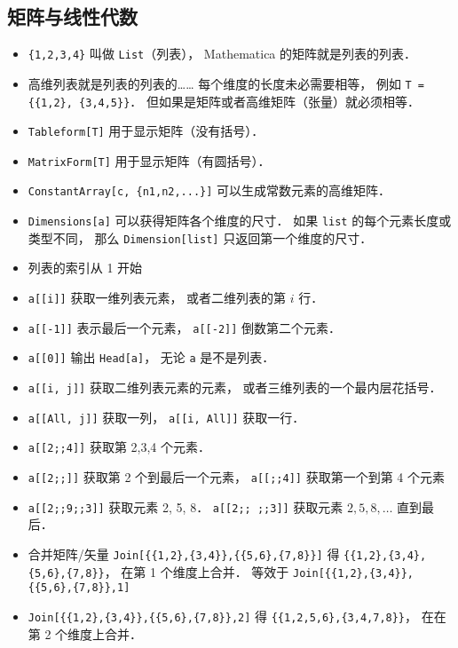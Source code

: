 \subsection{矩阵与线性代数}
\begin{itemize}
\item \verb|{1,2,3,4}| 叫做 \verb|List|（列表）， Mathematica 的矩阵就是列表的列表．
\item 高维列表就是列表的列表的…… 每个维度的长度未必需要相等， 例如 \verb|T = {{1,2}, {3,4,5}}|． 但如果是矩阵或者高维矩阵（张量）就必须相等．
\item \verb|Tableform[T]| 用于显示矩阵（没有括号）．
\item \verb|MatrixForm[T]| 用于显示矩阵（有圆括号）．
\item \verb|ConstantArray[c, {n1,n2,...}]| 可以生成常数元素的高维矩阵．
\item \verb|Dimensions[a]| 可以获得矩阵各个维度的尺寸． 如果 \verb|list| 的每个元素长度或类型不同， 那么 \verb|Dimension[list]| 只返回第一个维度的尺寸．
\item 列表的索引从 1 开始
\item \verb|a[[i]]| 获取一维列表元素， 或者二维列表的第 $i$ 行．
\item \verb|a[[-1]]| 表示最后一个元素， \verb|a[[-2]]| 倒数第二个元素．
\item \verb|a[[0]]| 输出 \verb|Head[a]|， 无论 \verb|a| 是不是列表．
\item \verb|a[[i, j]]| 获取二维列表元素的元素， 或者三维列表的一个最内层花括号．
\item \verb|a[[All, j]]| 获取一列， \verb|a[[i, All]]| 获取一行．
\item \verb|a[[2;;4]]| 获取第 2,3,4 个元素．
\item \verb|a[[2;;]]| 获取第 2 个到最后一个元素， \verb|a[[;;4]]| 获取第一个到第 4 个元素
\item \verb|a[[2;;9;;3]]| 获取元素 2, 5, 8． \verb|a[[2;; ;;3]]| 获取元素 $2, 5, 8, \dots$ 直到最后．
\item 合并矩阵/矢量 \verb|Join[{{1,2},{3,4}},{{5,6},{7,8}}]| 得 \verb|{{1,2},{3,4},{5,6},{7,8}}|， 在第 1 个维度上合并． 等效于 \verb|Join[{{1,2},{3,4}},{{5,6},{7,8}},1]|
\item \verb|Join[{{1,2},{3,4}},{{5,6},{7,8}},2]| 得 \verb|{{1,2,5,6},{3,4,7,8}}|， 在在第 2 个维度上合并．
\end{itemize}


